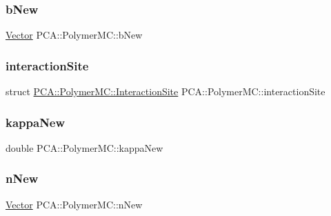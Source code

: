 \subsubsection{\texorpdfstring{b\+New}{bNew}}
{\footnotesize\ttfamily \hyperlink{class_p_c_a_1_1_vector}{Vector} P\+C\+A\+::\+Polymer\+M\+C\+::b\+New\hspace{0.3cm}{\ttfamily [private]}}

\hypertarget{class_p_c_a_1_1_polymer_m_c_ac4bbb885c9b1953dd3bd2fbf1656822e}{}\label{class_p_c_a_1_1_polymer_m_c_ac4bbb885c9b1953dd3bd2fbf1656822e} 
\subsubsection{\texorpdfstring{interaction\+Site}{interactionSite}}
{\footnotesize\ttfamily struct \hyperlink{struct_p_c_a_1_1_polymer_m_c_1_1_interaction_site}{P\+C\+A\+::\+Polymer\+M\+C\+::\+Interaction\+Site}  P\+C\+A\+::\+Polymer\+M\+C\+::interaction\+Site\hspace{0.3cm}{\ttfamily [private]}}

\hypertarget{class_p_c_a_1_1_polymer_m_c_a6771be27571e5c106546eb5225edec05}{}\label{class_p_c_a_1_1_polymer_m_c_a6771be27571e5c106546eb5225edec05} 
\subsubsection{\texorpdfstring{kappa\+New}{kappaNew}}
{\footnotesize\ttfamily double P\+C\+A\+::\+Polymer\+M\+C\+::kappa\+New\hspace{0.3cm}{\ttfamily [private]}}

\hypertarget{class_p_c_a_1_1_polymer_m_c_a5e493ca12a3eba2f1658ac1cccba3d56}{}\label{class_p_c_a_1_1_polymer_m_c_a5e493ca12a3eba2f1658ac1cccba3d56} 
\subsubsection{\texorpdfstring{n\+New}{nNew}}
{\footnotesize\ttfamily \hyperlink{class_p_c_a_1_1_vector}{Vector} P\+C\+A\+::\+Polymer\+M\+C\+::n\+New\hspace{0.3cm}{\ttfamily [private]}}

